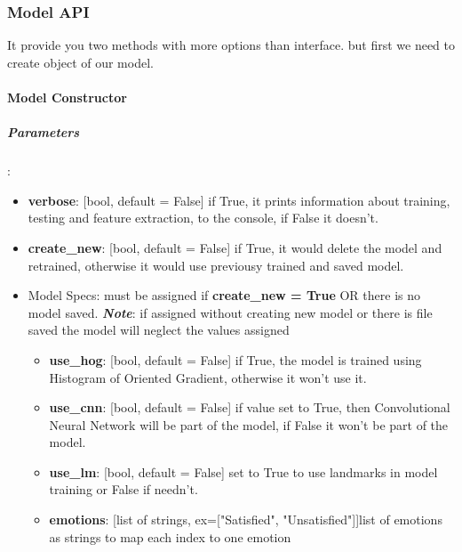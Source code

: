 \subsubsection{Model API}
It provide you two methods with more options than interface.\newline
but first we need to create object of our model.
\bigbreak

\paragraph{Model Constructor}

\subparagraph{Parameters}:
\begin{changemargin}{0.5cm}{0cm}
\begin{itemize}
	\item \textbf{verbose}: [bool, default = False] if True, it prints information about training, testing and feature extraction, to the console, if False it doesn't.
	
	\item \textbf{create\_new}: [bool, default = False] if True, it would delete the model and retrained, otherwise it would use previousy trained and saved model.
	
	\item Model Specs: must be assigned if \textbf{create\_new = True} OR there is no model saved.
		\newline
		\textbf{\textit{Note}}: if assigned without creating new model or there is file saved the model will neglect the values assigned
		\begin{itemize}
			\item \textbf{use\_hog}: [bool, default = False] if True, the model is trained using  Histogram of Oriented Gradient, otherwise it won't use it.

			\item \textbf{use\_cnn}: [bool, default = False] if value set to True, then Convolutional Neural Network will be part of the model, if False it won't be part of the model.
			
			\item \textbf{use\_lm}: [bool, default = False] set to True to use landmarks in model training or False if needn't.
			
			\item \textbf{emotions}: [list of strings, ex=["Satisfied", "Unsatisfied"]]list of emotions as strings to map each index to one emotion 
		\end{itemize}
		
\end{itemize}
\end{changemargin}

